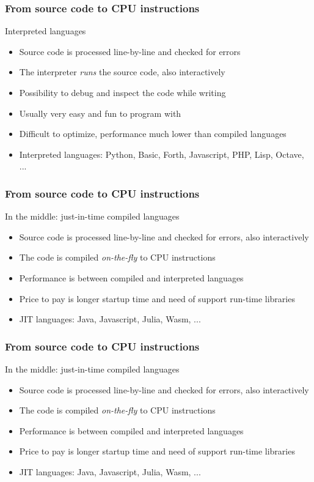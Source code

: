 \documentclass{beamer}
\begin{document}
\begin{frame}[fragile]
  \frametitle{From source code to CPU instructions}
  \begin{block}{Interpreted languages}
  \begin{itemize}
  \item Source code is processed line-by-line and checked for errors\pause
  \item The interpreter \emph{runs} the source code, also interactively\pause
  \item Possibility to debug and inspect the code while writing\pause
  \item Usually very easy and fun to program with\pause
  \item Difficult to optimize, performance much lower than compiled languages\pause
  \item Interpreted languages: Python, Basic, Forth, Javascript, PHP, Lisp, Octave, ...
  \end{itemize}
  \end{block}
\end{frame}

\begin{frame}[fragile]
  \frametitle{From source code to CPU instructions}
  \begin{block}{In the middle: just-in-time compiled languages}
  \begin{itemize}
  \item Source code is processed line-by-line and checked for errors,
        also interactively\pause
  \item The code is compiled \emph{on-the-fly} to CPU instructions\pause
  \item Performance is between compiled and interpreted languages\pause
  \item Price to pay is longer startup time and need of support run-time
        libraries\pause
  \item JIT languages: Java, Javascript, Julia, Wasm, ...
  \end{itemize}
  \end{block}
\end{frame}

\begin{frame}[fragile]
  \frametitle{From source code to CPU instructions}
  \begin{block}{In the middle: just-in-time compiled languages}
  \begin{itemize}
  \item Source code is processed line-by-line and checked for errors,
        also interactively\pause
  \item The code is compiled \emph{on-the-fly} to CPU instructions\pause
  \item Performance is between compiled and interpreted languages\pause
  \item Price to pay is longer startup time and need of support run-time
        libraries\pause
  \item JIT languages: Java, Javascript, Julia, Wasm, ...
  \end{itemize}
  \end{block}
\end{frame}
\end{document}
